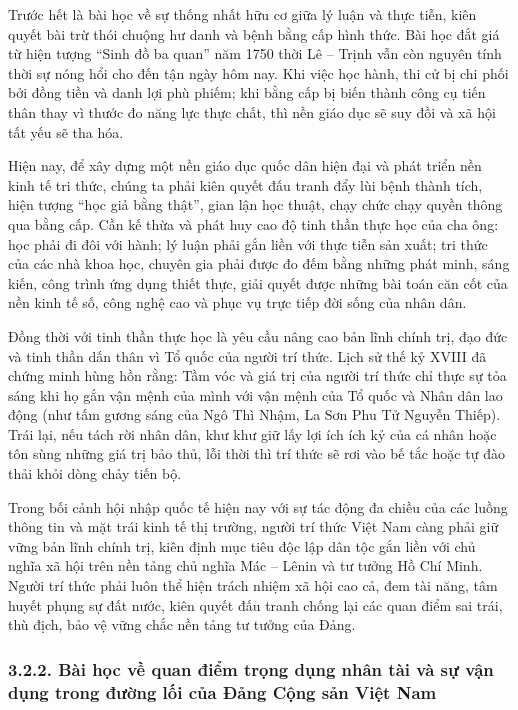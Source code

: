 Trước hết là bài học về sự thống nhất hữu cơ giữa lý luận và thực tiễn, kiên quyết bài trừ thói chuộng hư danh và bệnh bằng cấp hình thức. Bài học đắt giá từ hiện tượng ``Sinh đồ ba quan'' năm 1750 thời Lê -- Trịnh vẫn còn nguyên tính thời sự nóng hổi cho đến tận ngày hôm nay. Khi việc học hành, thi cử bị chi phối bởi đồng tiền và danh lợi phù phiếm; khi bằng cấp bị biến thành công cụ tiến thân thay vì thước đo năng lực thực chất, thì nền giáo dục sẽ suy đồi và xã hội tất yếu sẽ tha hóa.

Hiện nay, để xây dựng một nền giáo dục quốc dân hiện đại và phát triển nền kinh tế tri thức, chúng ta phải kiên quyết đấu tranh đẩy lùi bệnh thành tích, hiện tượng ``học giả bằng thật'', gian lận học thuật, chạy chức chạy quyền thông qua bằng cấp. Cần kế thừa và phát huy cao độ tinh thần thực học của cha ông: học phải đi đôi với hành; lý luận phải gắn liền với thực tiễn sản xuất; tri thức của các nhà khoa học, chuyên gia phải được đo đếm bằng những phát minh, sáng kiến, công trình ứng dụng thiết thực, giải quyết được những bài toán căn cốt của nền kinh tế số, công nghệ cao và phục vụ trực tiếp đời sống của nhân dân.

Đồng thời với tinh thần thực học là yêu cầu nâng cao bản lĩnh chính trị, đạo đức và tinh thần dấn thân vì Tổ quốc của người trí thức. Lịch sử thế kỷ XVIII đã chứng minh hùng hồn rằng: Tầm vóc và giá trị của người trí thức chỉ thực sự tỏa sáng khi họ gắn vận mệnh của mình với vận mệnh của Tổ quốc và Nhân dân lao động (như tấm gương sáng của Ngô Thì Nhậm, La Sơn Phu Tử Nguyễn Thiếp). Trái lại, nếu tách rời nhân dân, khư khư giữ lấy lợi ích ích kỷ của cá nhân hoặc tôn sùng những giá trị bảo thủ, lỗi thời thì trí thức sẽ rơi vào bế tắc hoặc tự đào thải khỏi dòng chảy tiến bộ.

Trong bối cảnh hội nhập quốc tế hiện nay với sự tác động đa chiều của các luồng thông tin và mặt trái kinh tế thị trường, người trí thức Việt Nam càng phải giữ vững bản lĩnh chính trị, kiên định mục tiêu độc lập dân tộc gắn liền với chủ nghĩa xã hội trên nền tảng chủ nghĩa Mác -- Lênin và tư tưởng Hồ Chí Minh. Người trí thức phải luôn thể hiện trách nhiệm xã hội cao cả, đem tài năng, tâm huyết phụng sự đất nước, kiên quyết đấu tranh chống lại các quan điểm sai trái, thù địch, bảo vệ vững chắc nền tảng tư tưởng của Đảng.

\subsubsection*{3.2.2. Bài học về quan điểm trọng dụng nhân tài và sự vận dụng trong đường lối của Đảng Cộng sản Việt Nam}

